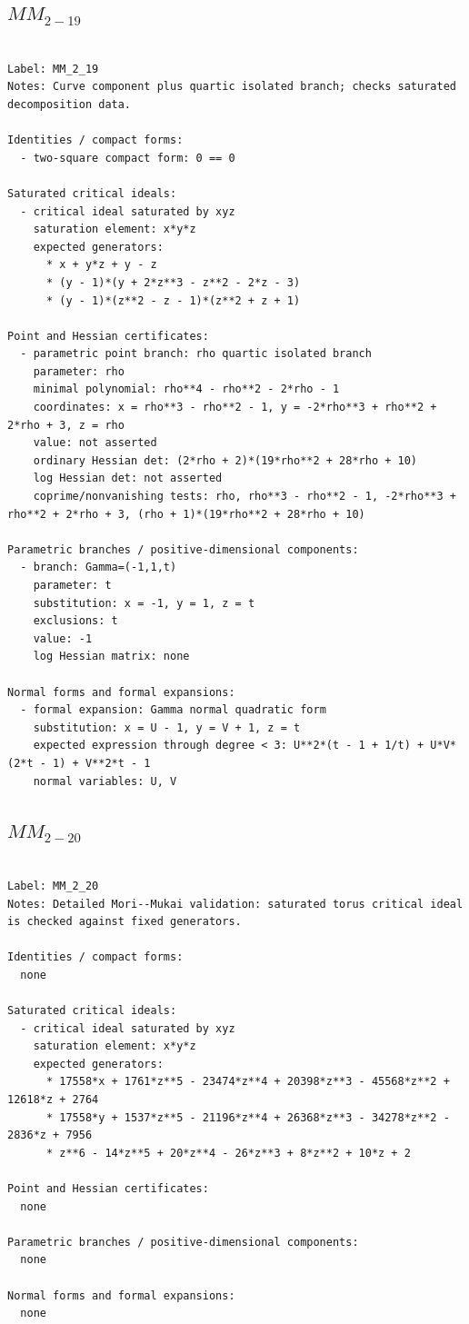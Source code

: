 \documentclass[10pt,a4paper]{article}
\begin{document}
\subsection*{$ MM_{2-19} $}

\begin{lstlisting}

Label: MM_2_19
Notes: Curve component plus quartic isolated branch; checks saturated decomposition data.

Identities / compact forms:
  - two-square compact form: 0 == 0

Saturated critical ideals:
  - critical ideal saturated by xyz
    saturation element: x*y*z
    expected generators:
      * x + y*z + y - z
      * (y - 1)*(y + 2*z**3 - z**2 - 2*z - 3)
      * (y - 1)*(z**2 - z - 1)*(z**2 + z + 1)

Point and Hessian certificates:
  - parametric point branch: rho quartic isolated branch
    parameter: rho
    minimal polynomial: rho**4 - rho**2 - 2*rho - 1
    coordinates: x = rho**3 - rho**2 - 1, y = -2*rho**3 + rho**2 + 2*rho + 3, z = rho
    value: not asserted
    ordinary Hessian det: (2*rho + 2)*(19*rho**2 + 28*rho + 10)
    log Hessian det: not asserted
    coprime/nonvanishing tests: rho, rho**3 - rho**2 - 1, -2*rho**3 + rho**2 + 2*rho + 3, (rho + 1)*(19*rho**2 + 28*rho + 10)

Parametric branches / positive-dimensional components:
  - branch: Gamma=(-1,1,t)
    parameter: t
    substitution: x = -1, y = 1, z = t
    exclusions: t
    value: -1
    log Hessian matrix: none

Normal forms and formal expansions:
  - formal expansion: Gamma normal quadratic form
    substitution: x = U - 1, y = V + 1, z = t
    expected expression through degree < 3: U**2*(t - 1 + 1/t) + U*V*(2*t - 1) + V**2*t - 1
    normal variables: U, V

\end{lstlisting}

\subsection*{$ MM_{2-20} $}

\begin{lstlisting}

Label: MM_2_20
Notes: Detailed Mori--Mukai validation: saturated torus critical ideal is checked against fixed generators.

Identities / compact forms:
  none

Saturated critical ideals:
  - critical ideal saturated by xyz
    saturation element: x*y*z
    expected generators:
      * 17558*x + 1761*z**5 - 23474*z**4 + 20398*z**3 - 45568*z**2 + 12618*z + 2764
      * 17558*y + 1537*z**5 - 21196*z**4 + 26368*z**3 - 34278*z**2 - 2836*z + 7956
      * z**6 - 14*z**5 + 20*z**4 - 26*z**3 + 8*z**2 + 10*z + 2

Point and Hessian certificates:
  none

Parametric branches / positive-dimensional components:
  none

Normal forms and formal expansions:
  none

\end{lstlisting}
\end{document}
